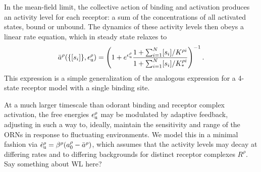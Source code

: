 \documentclass[9pt,twocolumn,twoside]{pnas-new}
\begin{document}
In the mean-field limit, the collective action of binding and activation produces an activity level for each receptor: a sum of the concentrations of all activated states, bound or unbound. 
The dynamics of these activity levels then obeys a linear rate equation, which in steady state relaxes to
\begin{align}
\bar a^\rho(\{[s_i]\}, \epsilon_{\text {u}}^\rho) = \left( 1 + e^{\epsilon^\rho_{\text u}}\frac{1 + \sum_{i=1}^N [s_i]/K^{\rho i}}{1 + \sum_{i=1}^N [s_i]/K_*^{\rho i}}\right)^{-1}.
\label{eq:steady_state_activity}
\end{align}
This expression is a simple generalization of the analogous expression for a 4-state receptor model with a single binding site. 

At a much larger timescale than odorant binding and receptor complex activation, the free energies $\epsilon^\rho_{\text u}$ may be modulated by adaptive feedback, adjusting in such a way to, ideally, maintain the sensitivity and range of the ORNs in response to fluctuating environments. We model this in a minimal fashion via $\dot \epsilon_{\text u}^\rho = \beta^\rho(a_0^\rho - \bar a^\rho)$, which assumes that the activity levels may decay at differing rates and to differing backgrounds for distinct receptor complexes $R^\rho$. {\color {blue} Say something about WL here?}


\end{document}
